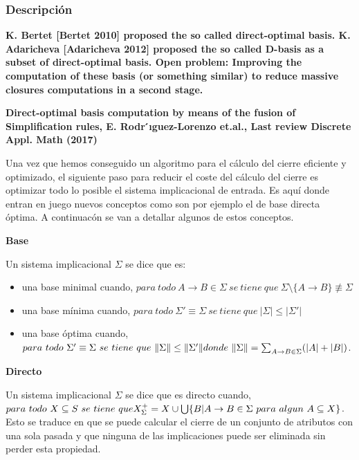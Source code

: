 \subsubsection{Descripci\'on} 

\textbf{
K. Bertet [Bertet 2010] proposed the so called direct-optimal basis.
K. Adaricheva [Adaricheva 2012] proposed the so called D-basis as a subset of direct-optimal basis.
Open problem: Improving the computation of these basis (or something similar) to reduce massive closures computations in a second stage.}


\textbf{Direct-optimal basis computation by means of the fusion of Simplification rules, E. Rodr ́ıguez-Lorenzo et.al., Last review Discrete Appl. Math (2017)}

Una vez que hemos conseguido un algoritmo para el c\'alculo del cierre eficiente y optimizado, el siguiente paso para reducir el coste del c\'alculo del cierre es optimizar todo lo posible el sistema implicacional de entrada. Es aqu\'i donde entran en juego nuevos conceptos como son por ejemplo el de base directa \'optima. A continuac\'on se van a detallar algunos de estos conceptos.

\textbf{Base}

Un sistema implicacional \( \Sigma \) se dice que es:
\begin{itemize}
    \item una base minimal cuando,  \( para \ todo \ A \to B \in \Sigma \ se \ tiene \ que \ \Sigma \setminus \{A \to B\} \not\equiv \Sigma\)

    \item una base m\'inima cuando,  \( para \ todo \ \Sigma' \equiv \Sigma \ se \ tiene \ que \ |\Sigma| \leq |\Sigma'|\)

    \item una base \'optima cuando,  \( para \ todo \ \Sigma' \equiv \Sigma \ se \ tiene \ que \ \|\Sigma\| \leq \|\Sigma'\| \\ donde \ \|\Sigma\| = 
    \sum_{\substack{A \to B \in \Sigma}} (|A|+|B|) \).
\end{itemize}

\textbf{Directo}

Un sistema implicacional \( \Sigma \) se dice que es directo  cuando, \( para \ todo \ X \subseteq S \ se \ tiene \ que \\ X^+_{\Sigma} =  X \cup \bigcup\{ B | A \to B \in \Sigma \ para \ algun \ A \subseteq X \} \). Esto se traduce en que se puede calcular el cierre de un conjunto de atributos con una sola pasada y que ninguna de las implicaciones puede ser eliminada sin perder esta propiedad.

